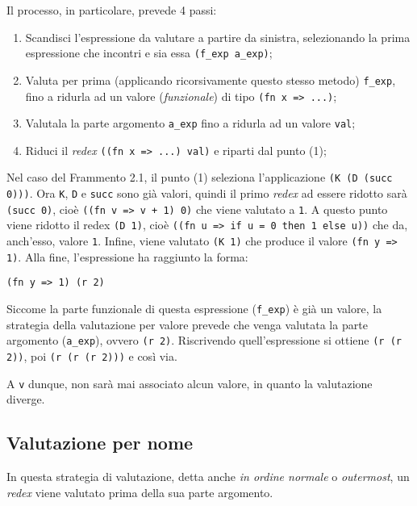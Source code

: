 \documentclass[12pt, a4paper]{report}
\theoremstyle{definition}
\newcommand{\code}[1]{\texttt{#1}}
\begin{document}
Il processo, in particolare, prevede 4 passi:
\begin{enumerate}
    \item Scandisci l'espressione da valutare a partire da sinistra, selezionando
    la prima espressione che incontri e sia essa \code{(f\_exp a\_exp)};
    \item Valuta per prima (applicando ricorsivamente questo stesso metodo)
    \code{f\_exp}, fino a ridurla ad un valore (\emph{funzionale}) di tipo \code
    {(fn x => ...)};
    \item Valutala la parte argomento \code{a\_exp} fino a ridurla ad un valore
    \code{val};
    \item Riduci il \emph{redex} \code{((fn x => ...) val)} e riparti dal punto (1);
\end{enumerate}
Nel caso del Frammento 2.1, il punto (1) seleziona l'applicazione
\code{(K (D (succ 0)))}. Ora \code{K}, \code{D} e \code{succ} sono già valori,
quindi il primo \emph{redex} ad essere ridotto sarà \code{(succ 0)}, cioè 
\code{((fn v => v + 1) 0)} che viene valutato a \code{1}. A questo punto viene
ridotto il redex \code{(D 1)}, cioè \code{((fn u => if u = 0 then 1 else u))}
che da, anch'esso, valore \code{1}. Infine, viene valutato \code{(K 1)} che
produce il valore \code{(fn y => 1)}.
Alla fine, l'espressione ha raggiunto la forma:
\begin{lstlisting}
(fn y => 1) (r 2)
\end{lstlisting}

Siccome la parte funzionale di questa espressione (\code{f\_exp}) è già un valore,
la strategia della valutazione per valore prevede che venga valutata la parte
argomento (\code{a\_exp}), ovvero \code{(r 2)}. Riscrivendo quell'espressione
si ottiene \code{(r (r 2))}, poi \code{(r (r (r 2)))} e così via.

A \code{v} dunque, non sarà mai associato alcun valore, in quanto la valutazione
diverge.

\subsection{Valutazione per nome}
In questa strategia di valutazione, detta anche \emph{in ordine normale} o
\emph{outermost}, un \emph{redex} viene valutato prima della sua parte argomento.
\end{document}
